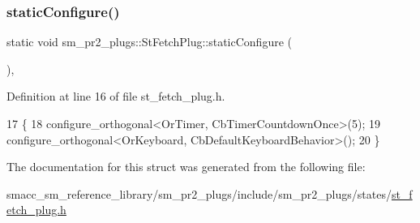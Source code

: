 \subsubsection{\texorpdfstring{static\+Configure()}{staticConfigure()}}
{\footnotesize\ttfamily static void sm\+\_\+pr2\+\_\+plugs\+::\+St\+Fetch\+Plug\+::static\+Configure (\begin{DoxyParamCaption}{ }\end{DoxyParamCaption})\hspace{0.3cm}{\ttfamily [inline]}, {\ttfamily [static]}}



Definition at line 16 of file st\+\_\+fetch\+\_\+plug.\+h.


\begin{DoxyCode}
17     \{
18         configure\_orthogonal<OrTimer,  CbTimerCountdownOnce>(5);    
19         configure\_orthogonal<OrKeyboard, CbDefaultKeyboardBehavior>();
20     \}
\end{DoxyCode}


The documentation for this struct was generated from the following file\+:\begin{DoxyCompactItemize}
\item 
smacc\+\_\+sm\+\_\+reference\+\_\+library/sm\+\_\+pr2\+\_\+plugs/include/sm\+\_\+pr2\+\_\+plugs/states/\hyperlink{st__fetch__plug_8h}{st\+\_\+fetch\+\_\+plug.\+h}\end{DoxyCompactItemize}
